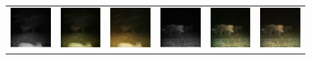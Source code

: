 \begin{figure}[htp!]
\begin{tabularx}{\textwidth}{>{\centering\arraybackslash}X >{\centering\arraybackslash}X >{\centering\arraybackslash}X >{\centering\arraybackslash}X >{\centering\arraybackslash}X >{\centering\arraybackslash}X}
        \includegraphics{gfx/diffusion-sampling-full-vs-high-pass-filter-qual/nir_S2_B06_R1_PICT0387.jpg} & \includegraphics{gfx/diffusion-sampling-full-vs-high-pass-filter-qual/full-pass_S2_B06_R1_PICT0387.png} & \includegraphics{gfx/diffusion-sampling-full-vs-high-pass-filter-qual/high-pass_S2_B06_R1_PICT0387.png} & \includegraphics{gfx/diffusion-sampling-full-vs-high-pass-filter-qual/nir_S2_B06_R3_PICT1364.jpg} & \includegraphics{gfx/diffusion-sampling-full-vs-high-pass-filter-qual/full-pass_S2_B06_R3_PICT1364.png} & \includegraphics{gfx/diffusion-sampling-full-vs-high-pass-filter-qual/high-pass_S2_B06_R3_PICT1364.png}\\

\end{tabularx}
\end{figure}
